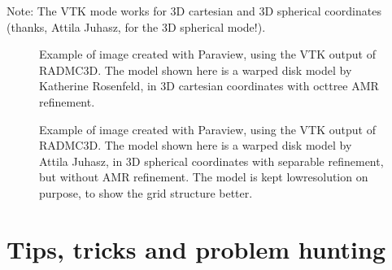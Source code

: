 \documentclass[letterpaper,10pt,english]{sphinxmanual}
\begin{document}
Note: The VTK mode works for 3\sphinxhyphen{}D cartesian and 3\sphinxhyphen{}D spherical coordinates
(thanks, Attila Juhasz, for the 3\sphinxhyphen{}D spherical mode!).

\begin{figure}[htbp]
\centering
\capstart

\noindent{}
\caption{Example of image created with Paraview, using the VTK output of RADMC\sphinxhyphen{}3D.
The model shown here is a warped disk model by Katherine Rosenfeld, in 3\sphinxhyphen{}D
cartesian coordinates with oct\sphinxhyphen{}tree AMR refinement.}\label{\detokenize{vtkoutput:id1}}\label{\detokenize{vtkoutput:fig-disk-with-vtk}}\end{figure}

\begin{figure}[htbp]
\centering
\capstart

\noindent{}
\caption{Example of image created with Paraview, using the VTK output of RADMC\sphinxhyphen{}3D.
The model shown here is a warped disk model by Attila Juhasz, in 3\sphinxhyphen{}D
spherical coordinates with separable refinement, but without AMR refinement.
The model is kept low\sphinxhyphen{}resolution on purpose, to show the grid structure
better.}\label{\detokenize{vtkoutput:id2}}\label{\detokenize{vtkoutput:fig-modeljuhasz-with-vtk}}\end{figure}


\chapter{Tips, tricks and problem hunting}
\label{\detokenize{tipsandtricks:tips-tricks-and-problem-hunting}}\label{\detokenize{tipsandtricks:chap-problem-hunting}}\label{\detokenize{tipsandtricks::doc}}
\end{document}
